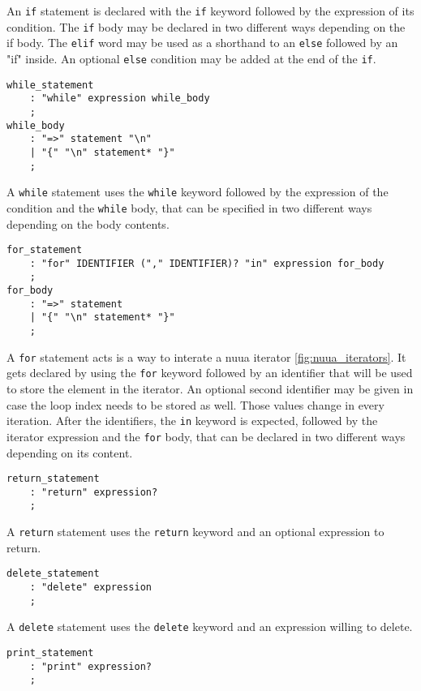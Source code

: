 An \texttt{if} statement is declared with the \texttt{if} keyword followed by the expression of its condition.
The \texttt{if} body may be declared in two different ways depending on the if body. The \texttt{elif} word may be used as a shorthand
to an \texttt{else} followed by an "if" inside. An optional \texttt{else} condition may be added at the end of the \texttt{if}.

\begin{lstlisting}
while_statement
    : "while" expression while_body
    ;
while_body
    : "=>" statement "\n"
    | "{" "\n" statement* "}"
    ;
\end{lstlisting}

A \texttt{while} statement uses the \texttt{while} keyword followed by the expression of the condition and the \texttt{while} body, that can be specified
in two different ways depending on the body contents.

\begin{lstlisting}
for_statement
    : "for" IDENTIFIER ("," IDENTIFIER)? "in" expression for_body
    ;
for_body
    : "=>" statement
    | "{" "\n" statement* "}"
    ;
\end{lstlisting}

A \texttt{for} statement acts is a way to interate a nuua iterator \autoref{fig:nuua_iterators}.
It gets declared by using the \texttt{for} keyword followed by an identifier that will be used to store the element
in the iterator. An optional second identifier may be given in case the loop index needs to be stored as well.
Those values change in every iteration. After the identifiers, the \texttt{in} keyword is expected, followed by the iterator expression and the
\texttt{for} body, that can be declared in two different ways depending on its content.

\begin{lstlisting}
return_statement
    : "return" expression?
    ;
\end{lstlisting}

A \texttt{return} statement uses the \texttt{return} keyword and an optional expression to return.

\begin{lstlisting}
delete_statement
    : "delete" expression
    ;
\end{lstlisting}

A \texttt{delete} statement uses the \texttt{delete} keyword and an expression willing to delete.

\begin{lstlisting}
print_statement
    : "print" expression?
    ;
\end{lstlisting}


